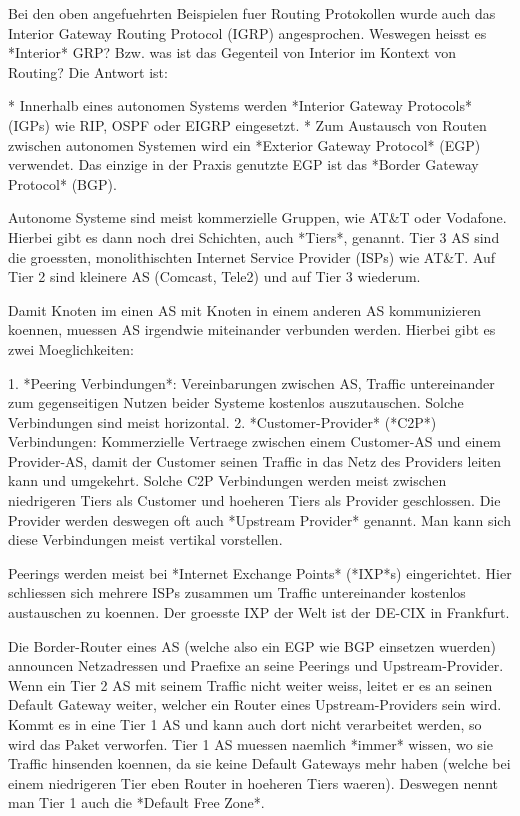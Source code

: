 Bei den oben angefuehrten Beispielen fuer Routing Protokollen wurde auch das
Interior Gateway Routing Protocol (IGRP) angesprochen. Weswegen heisst es
*Interior* GRP? Bzw. was ist das Gegenteil von Interior im Kontext von Routing?
Die Antwort ist:

* Innerhalb eines autonomen Systems werden *Interior Gateway Protocols* (IGPs)
  wie RIP, OSPF oder EIGRP eingesetzt.
* Zum Austausch von Routen zwischen autonomen Systemen wird ein *Exterior
  Gateway Protocol* (EGP) verwendet. Das einzige in der Praxis genutzte EGP ist
  das *Border Gateway Protocol* (BGP).

Autonome Systeme sind meist kommerzielle Gruppen, wie AT\&T oder
Vodafone. Hierbei gibt es dann noch drei Schichten, auch *Tiers*, genannt. Tier
3 AS sind die groessten, monolithischten Internet Service Provider (ISPs) wie
AT\&T. Auf Tier 2 sind kleinere AS (Comcast, Tele2) und auf Tier 3 wiederum.

Damit Knoten im einen AS mit Knoten in einem anderen AS kommunizieren koennen,
muessen AS irgendwie miteinander verbunden werden. Hierbei gibt es zwei
Moeglichkeiten:

1. *Peering Verbindungen*: Vereinbarungen zwischen AS, Traffic untereinander zum
   gegenseitigen Nutzen beider Systeme kostenlos auszutauschen. Solche
   Verbindungen sind meist horizontal.
2. *Customer-Provider* (*C2P*) Verbindungen: Kommerzielle Vertraege zwischen
   einem Customer-AS und einem Provider-AS, damit der Customer seinen Traffic in
   das Netz des Providers leiten kann und umgekehrt. Solche C2P Verbindungen
   werden meist zwischen niedrigeren Tiers als Customer und hoeheren Tiers als
   Provider geschlossen. Die Provider werden deswegen oft auch *Upstream
   Provider* genannt. Man kann sich diese Verbindungen meist vertikal
   vorstellen.

Peerings werden meist bei *Internet Exchange Points* (*IXP*s) eingerichtet. Hier
schliessen sich mehrere ISPs zusammen um Traffic untereinander kostenlos
austauschen zu koennen. Der groesste IXP der Welt ist der DE-CIX in Frankfurt.

Die Border-Router eines AS (welche also ein EGP wie BGP einsetzen wuerden)
announcen Netzadressen und Praefixe an seine Peerings und
Upstream-Provider. Wenn ein Tier 2 AS mit seinem Traffic nicht weiter weiss,
leitet er es an seinen Default Gateway weiter, welcher ein Router eines
Upstream-Providers sein wird. Kommt es in eine Tier 1 AS und kann auch dort
nicht verarbeitet werden, so wird das Paket verworfen. Tier 1 AS muessen
naemlich *immer* wissen, wo sie Traffic hinsenden koennen, da sie keine Default
Gateways mehr haben (welche bei einem niedrigeren Tier eben Router in hoeheren
Tiers waeren). Deswegen nennt man Tier 1 auch die *Default Free Zone*.
